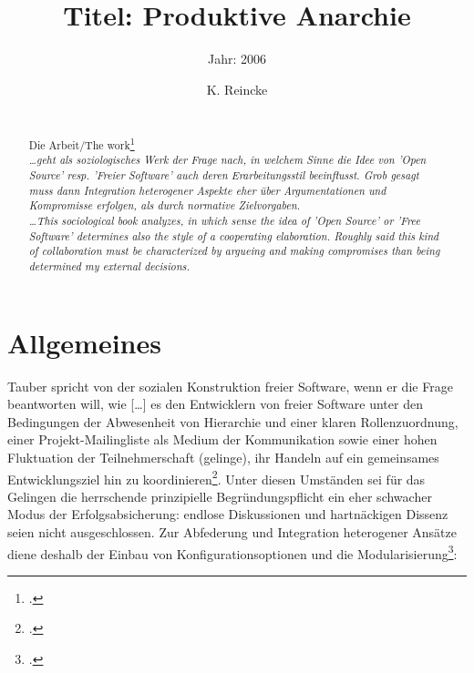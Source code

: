 \documentclass[DIV=calc,BCOR=5mm,11pt,headings=small,oneside,abstract=true, toc=bib]{scrartcl}
\begin{document}

\titlehead{Literaturexzerpt}
\subject{Autor(en): Niels C. Taubert}
\title{Titel: Produktive Anarchie}
\subtitle{Jahr: 2006 }
\author{K. Reincke}
\maketitle

\begin{abstract}
\noindent
\cite[(ist:)][]{Taubert2006a} \\
Die Arbeit/The work\footcite[][]{Taubert2006a} \\
\noindent \itshape
\ldots geht als soziologisches Werk der Frage nach, in welchem Sinne die Idee
von 'Open Source' resp. 'Freier Software' auch deren Erarbeitungsstil beeinflusst.
Grob gesagt muss dann Integration heterogener Aspekte eher über Argumentationen
und Kompromisse erfolgen, als durch normative Zielvorgaben.
\\
\noindent
\ldots This sociological book analyzes, in which sense the idea of 'Open Source'
or 'Free Software' determines also the style of a cooperating elaboration.
Roughly said this kind of collaboration must be characterized by argueing and
making compromises than being determined my external decisions.
\end{abstract}
\footnotesize
\normalsize

\section{Allgemeines}

Tauber spricht von der \glqq{}sozialen Konstruktion freier Software\grqq{}, wenn
er die Frage beantworten will, \glqq{}wie [\ldots] es den Entwicklern von freier
Software unter den Bedingungen der Abwesenheit von Hierarchie und einer klaren
Rollenzuordnung, einer Projekt-Mailingliste als Medium der Kommunikation sowie
einer hohen Fluktuation der Teilnehmerschaft (gelinge), ihr Handeln auf ein
gemeinsames Entwicklungsziel hin zu
koordinieren\grqq{}\footcite[cf.][205]{Taubert2006a}. Unter diesen Umständen
sei für das Gelingen die herrschende \glqq{}prinzipielle
Begründungspflicht\grqq{} ein eher \glqq{}schwacher Modus\grqq{} der
Erfolgsabsicherung: endlose Diskussionen und \glqq{}hartnäckigen Dissenz\grqq{}
seien nicht ausgeschlossen. Zur Abfederung und Integration heterogener Ansätze
diene deshalb der \glqq{}Einbau von Konfigurationsoptionen\grqq{} und die
Modularisierung\footcite[cf.][206]{Taubert2006a}:
\end{document}
